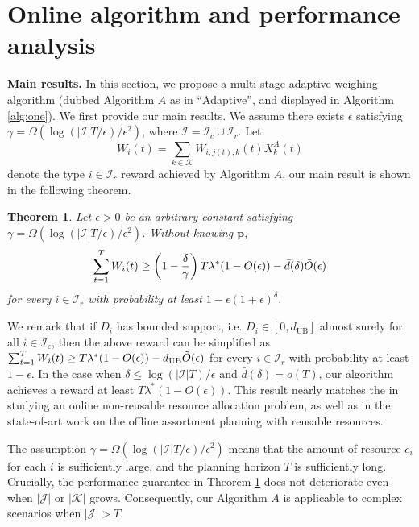 \documentclass[letterpaper, 10 pt, conference]{ieeeconf}  %
\newcommand{\III}{\mathcal{I}}
\newcommand{\JJJ}{\mathcal{J}}
\newcommand{\KKK}{\mathcal{K}}
\theoremstyle{plain}
\newtheorem{theorem}{Theorem}
\theoremstyle{definition}
\theoremstyle{remark}
\begin{document}
\section{Online algorithm and performance analysis}\label{sec:alg}

\textbf{Main results.} In this section, we propose a multi-stage adaptive weighing algorithm (dubbed Algorithm $A$ as in ``Adaptive'', and displayed in Algorithm \ref{alg:one}). We first provide our main results. We assume there exists $\epsilon$ satisfying $\gamma =  \Omega( \log ( |\III| T/\epsilon) / \epsilon^2)$, where $\III = \III_c \cup \III_r$. Let $$W_i(t) = \sum_{k \in \KKK} W_{i,j(t),k}(t) X^{A}_{k}(t)$$ denote the type $i \in \III_r$ reward achieved by Algorithm $A$, our main result is shown in the following theorem.

\begin{theorem}\label{othm:main}
Let $\epsilon>0$ be an arbitrary constant satisfying $\gamma= \Omega( \log ( |\III| T / \epsilon) / \epsilon^2 )$. Without knowing $\boldsymbol{p}$, \begin{align}
\sum^{T}_{t=1} W_i(t) \geq \left(1 - \frac{\delta}{\gamma}\right) T \lambda^* (1-O(\epsilon)) - \bar{d}(\delta) \Tilde{O}(\epsilon) \nonumber
\end{align}
for every $i\in \III_r$ with probability at least $1-\epsilon (1+\epsilon)^{\delta}$. 
\end{theorem}
We remark that if $D_i$ has bounded support, i.e. $D_i \in [0,d_{\text{UB}}]$ almost surely for all $i \in \III_c$, then the above reward can be simplified as $\sum^{T}_{t=1} W_i(t) \geq T \lambda^* (1-O(\epsilon)) - d_{\text{UB}} \Tilde{O}(\epsilon)$ for every $i\in \III_r$ with probability at least $1-\epsilon$. In the case when $\delta \leq \log(|\III|T)/\epsilon$ and $\bar{d}(\delta) = o(T)$, 
our algorithm achieves a reward at least $T \lambda^* (1-O(\epsilon))$. This result nearly matches the \cite{devanur2019near} in studying an online non-reusable resource allocation problem, as well as \cite{feng2022near} in the state-of-art work on the offline assortment planning with reusable resources.

The assumption $\gamma = \Omega( \log ( |\III| T / \epsilon) / \epsilon^2 )$ means that the amount of resource $c_i$ for each $i$ is sufficiently large, and the planning horizon $T$ is sufficiently long. Crucially, the performance guarantee in Theorem \ref{othm:main} does not deteriorate even when $|\JJJ|$ or $|\KKK |$ grows. Consequently, our Algorithm $A$ is applicable to complex scenarios when $|\JJJ| > T$. 
\end{document}

